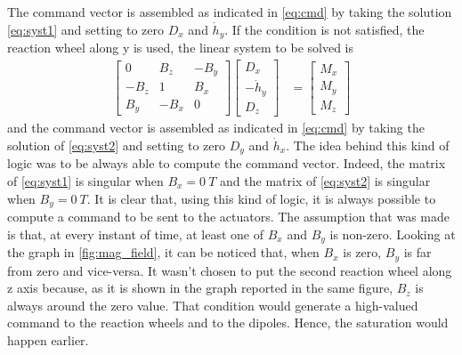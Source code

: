 The command vector is assembled as indicated in \autoref{eq:cmd} by taking the solution \autoref{eq:syst1} and setting to zero $D_x$ and $\Dot{h}_y$.  If the condition is not satisfied, the reaction wheel along y is used, the linear system to be solved is 
\begin{equation}
 \label{eq:syst2}
 \begin{aligned} 
    \begin{bmatrix}
        0 & B_z & -B_y \\
        -B_z & 1 & B_x \\
        B_y & -B_x & 0 
    \end{bmatrix}\begin{bmatrix}
        D_x \\
        -\Dot{h}_y \\
        D_z
    \end{bmatrix} &=\begin{bmatrix}
        M_x \\
        M_y \\
        M_z
    \end{bmatrix}
  \end{aligned}
\end{equation}
  and the command vector is assembled as indicated in \autoref{eq:cmd} by taking the solution of \autoref{eq:syst2} and setting to zero $D_y$ and $\Dot{h}_x$. The idea behind this kind of logic was to be always able to compute the command vector. Indeed, the matrix of \autoref{eq:syst1} is singular when $B_x=0 \ T$ and the matrix of \autoref{eq:syst2} is singular when $B_y= 0 \ T$. It is clear that, using this kind of logic, it is always possible to compute a command to be sent to the actuators. The assumption that was made is that, at every instant of time, at least one of $B_x$ and $B_y$ is non-zero. Looking at the graph in \autoref{fig:mag_field}, it can be noticed that, when $B_x$ is zero, $B_y$ is far from zero and vice-versa. It wasn't chosen to put the second reaction wheel along z axis because, as it is shown in the graph reported in the same figure, $B_z$ is always around the zero value. That condition would generate a high-valued command to the reaction wheels and to the dipoles. Hence, the saturation would happen earlier.

